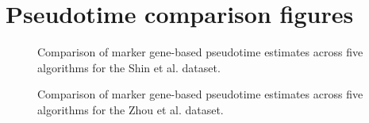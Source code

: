 \section{Pseudotime comparison figures}


\begin{figure}[h]
\centering

	\caption{Comparison of marker gene-based pseudotime estimates across five algorithms for the Shin et al. dataset.}
	\label{fig:shin-correlations}
\end{figure}

\begin{figure}[h]
\centering

	\caption{Comparison of marker gene-based pseudotime estimates across five algorithms for the Zhou et al. dataset.}
	\label{fig:zhou-correlations}
\end{figure}
